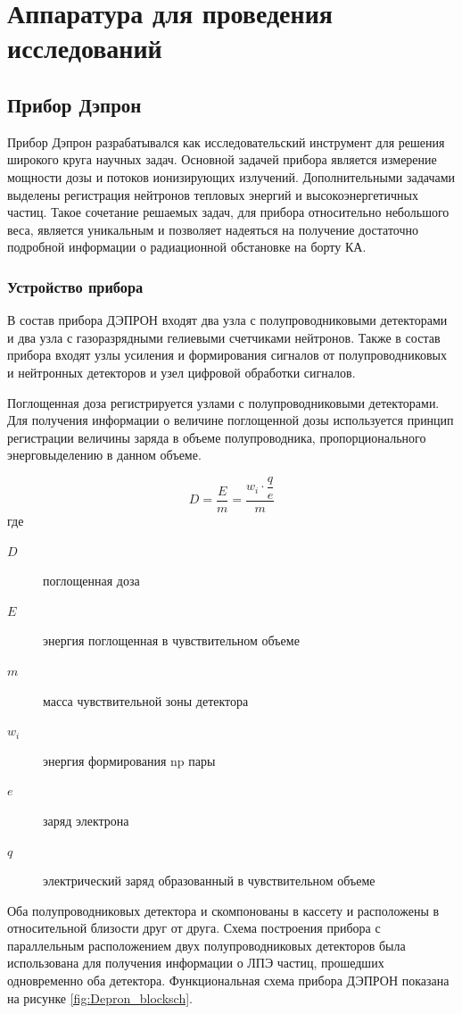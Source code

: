 \chapter{Аппаратура для проведения исследований} \label{chapt2}

\section{Прибор Дэпрон}

Прибор Дэпрон разрабатывался как исследовательский инструмент для решения широкого круга научных задач. Основной задачей прибора является измерение мощности дозы и потоков ионизирующих излучений. Дополнительными задачами выделены регистрация нейтронов тепловых энергий и высокоэнергетичных частиц. Такое сочетание решаемых задач, для прибора относительно небольшого веса,  является уникальным и позволяет надеяться на получение достаточно подробной информации о радиационной обстановке на борту КА. 

\subsection{Устройство прибора}

В состав прибора ДЭПРОН входят два узла с полупроводниковыми детекторами и два узла с газоразрядными гелиевыми счетчиками нейтронов. Также в состав прибора входят узлы усиления и формирования сигналов от полупроводниковых и нейтронных детекторов и узел цифровой обработки сигналов.


Поглощенная доза регистрируется узлами с полупроводниковыми детекторами. Для получения информации о величине поглощенной дозы используется принцип регистрации величины заряда в объеме полупроводника, пропорционального энерговыделению в данном объеме. 

\begin{equation}\label{eq:benghin_doze}
D = \frac{E}{m} = \dfrac{w_i \cdot\dfrac{q}{e}}{m}
\end{equation}
где \begin{description}
	\item[$ D $] поглощенная доза
	\item[$ E $] энергия поглощенная в чувствительном объеме
	\item[$ m $] масса чувствительной зоны детектора
	\item[$ w_i $] энергия формирования np пары
	\item[$ e $] заряд электрона
	\item[$ q $] электрический заряд образованный в чувствительном объеме
\end{description}
Оба полупроводниковых детектора и скомпонованы в кассету и расположены в относительной близости друг от друга. Схема построения прибора с параллельным расположением двух полупроводниковых детекторов была использована для получения информации о ЛПЭ частиц, прошедших одновременно оба детектора. Функциональная схема прибора ДЭПРОН показана на рисунке \ref{fig:Depron_blocksch}.
 
